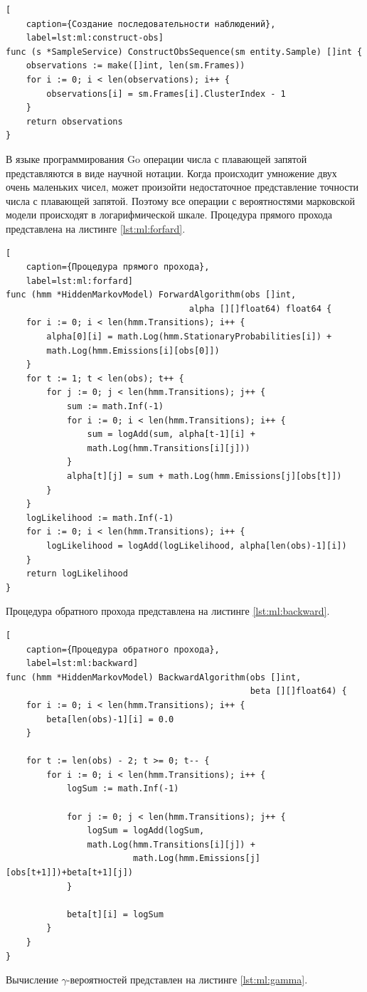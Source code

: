 \begin{lstlisting}[
	caption={Создание последовательности наблюдений},
	label=lst:ml:construct-obs]
func (s *SampleService) ConstructObsSequence(sm entity.Sample) []int {
	observations := make([]int, len(sm.Frames))
	for i := 0; i < len(observations); i++ {
		observations[i] = sm.Frames[i].ClusterIndex - 1
	}
	return observations
}
\end{lstlisting}
В языке программирования Go операции числа с плавающей запятой представляются в виде научной нотации. Когда происходит умножение двух очень маленьких чисел, может произойти недостаточное представление точности числа с плавающей запятой. Поэтому все операции с вероятностями марковской модели происходят в логарифмической шкале.
Процедура прямого прохода  представлена на листинге \ref{lst:ml:forfard}.
\begin{lstlisting}[
	caption={Процедура прямого прохода},
	label=lst:ml:forfard]
func (hmm *HiddenMarkovModel) ForwardAlgorithm(obs []int,
									alpha [][]float64) float64 {
	for i := 0; i < len(hmm.Transitions); i++ {
		alpha[0][i] = math.Log(hmm.StationaryProbabilities[i]) +
		math.Log(hmm.Emissions[i][obs[0]])
	}
	for t := 1; t < len(obs); t++ {
		for j := 0; j < len(hmm.Transitions); j++ {
			sum := math.Inf(-1)
			for i := 0; i < len(hmm.Transitions); i++ {
				sum = logAdd(sum, alpha[t-1][i] + 
				math.Log(hmm.Transitions[i][j]))
			}
			alpha[t][j] = sum + math.Log(hmm.Emissions[j][obs[t]])
		}
	}
	logLikelihood := math.Inf(-1)
	for i := 0; i < len(hmm.Transitions); i++ {
		logLikelihood = logAdd(logLikelihood, alpha[len(obs)-1][i])
	}
	return logLikelihood
}
\end{lstlisting}
Процедура обратного прохода представлена на листинге \ref{lst:ml:backward}. 
\begin{lstlisting}[
	caption={Процедура обратного прохода},
	label=lst:ml:backward]
func (hmm *HiddenMarkovModel) BackwardAlgorithm(obs []int, 
												beta [][]float64) {
	for i := 0; i < len(hmm.Transitions); i++ {
		beta[len(obs)-1][i] = 0.0
	}
	
	for t := len(obs) - 2; t >= 0; t-- {
		for i := 0; i < len(hmm.Transitions); i++ {
			logSum := math.Inf(-1)
			
			for j := 0; j < len(hmm.Transitions); j++ {
				logSum = logAdd(logSum,
				math.Log(hmm.Transitions[i][j]) + 
						 math.Log(hmm.Emissions[j][obs[t+1]])+beta[t+1][j])
			}
		
			beta[t][i] = logSum
		}
	}
}
\end{lstlisting}
Вычисление $\gamma$-вероятностей представлен на листинге \ref{lst:ml:gamma}.
